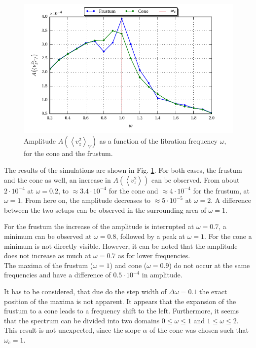\begin{figure}[!bp]
  \centering
  \includegraphics{gfx/cone/experiment/experiment.pdf}
  \caption{Amplitude $A\left(\left<v^2_z\right>_V\right)$ as a function of the libration frequency $\omega$,
            for the cone and the frustum.  \label{fig:cone_expseries} }
\end{figure}

The results of the simulations are shown in Fig. \ref{fig:cone_expseries}.
For both cases, the frustum and the cone as well, an increase in $A\left(\left<v^2_z\right>\right)$ can be observed.
From  about $2\cdot10^{-4}$ at $\omega=0.2$, to  $\approx 3.4\cdot10^{-4}$ for the cone and $\approx 4\cdot10^{-4}$ for the frustum,  at $\omega=1$.
From here on, the amplitude decreases to $\approx 5\cdot10^{-5}$ at $\omega=2$.
A difference between the two setups can be observed in the surrounding area of $\omega=1$.

For the frustum the increase of the amplitude is interrupted at $\omega=0.7$, a minimum can be observed at $\omega=0.8$, followed by
a peak at $\omega=1$. For the cone a minimum is not directly visible. However, it can be noted that the
amplitude does not increase as much at $\omega=0.7$ as for lower frequencies.\\
The maxima of the frustum ($\omega=1$) and cone ($\omega=0.9$) do not occur
at the same frequencies and have a difference of $0.5\cdot10^{-4}$ in amplitude.

It has to be considered, that due do the step width of $\Delta\omega = 0.1$ the exact position of the maxima is not apparent.
It appears that the expansion of the frustum to a cone leads to a frequency shift to the left.
Furthermore, it seems that the spectrum can be divided into two domains $0\leq\omega\leq1$ and $1 \leq \omega\leq 2$.
This result is not unexpected, since the slope $\alpha$ of the cone was chosen such that $\omega_c=1$.

